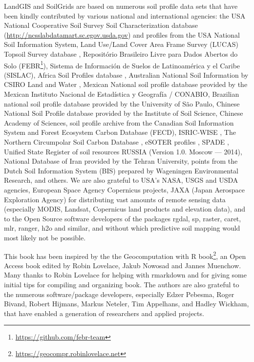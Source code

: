 \documentclass[graybox,natbib,nospthms,UStrade]{svmono}
\renewcommand{\href}[2]{#2 (\url{#1})}
\renewcommand{\href}[2]{#2\footnote{\url{#1}}}
\begin{document}
LandGIS and SoilGrids are based on numerous soil profile data sets that have been
kindly contributed by various national and international agencies: the
USA National Cooperative Soil Survey Soil Characterization database
(\url{http://ncsslabdatamart.sc.egov.usda.gov}) and profiles from the USA
National Soil Information System, Land Use/Land Cover Area
Frame Survey (LUCAS) Topsoil Survey database \citep{Toth2013LUCAS},
Repositório Brasileiro Livre para Dados Abertos do Solo (\href{https://github.com/febr-team}{FEBR}),
Sistema de Información de Suelos de Latinoamérica y el Caribe (SISLAC),
Africa Soil Profiles database \citep{Leenaars2012}, Australian National Soil
Information by CSIRO Land and Water \citep{Karssies2011CSIRO, searle2014australian},
Mexican National soil profile database \citep{INEGI2000} provided by
the Mexican Instituto Nacional de Estadística y Geografía / CONABIO,
Brazilian national soil profile database \citep{cooper2005national}
provided by the University of São Paulo, Chinese
National Soil Profile database \citep{shangguan2013china} provided by the
Institute of Soil Science, Chinese Academy of Sciences, soil profile
archive from the Canadian Soil Information System \citep{macdonald1992cansis}
and Forest Ecosystem Carbon Database (FECD), ISRIC-WISE \citep{Batjes2009SUM},
The Northern Circumpolar Soil Carbon Database \citep{essd-5-3-2013}, eSOTER
profiles \citep{VanEngelen2012}, SPADE \citep{hollis2006spade}, Unified State Register
of soil resources RUSSIA (Version 1.0. Moscow --- 2014), National Database
of Iran provided by the Tehran University, points from the Dutch Soil
Information System (BIS) prepared by Wageningen Environmental Research,
and others. We are also grateful to USA's NASA, USGS and USDA agencies,
European Space Agency Copernicus projects, JAXA (Japan Aerospace Exploration Agency)
for distributing vast amounts of remote sensing data (especially MODIS, Landsat, Copernicus
land products and elevation data), and to the Open Source software developers
of the packages rgdal, sp, raster, caret, mlr, ranger, h2o and similar,
and without which predictive soil mapping would most likely not be possible.

This book has been inspired by the \href{https://geocompr.robinlovelace.net}{the Geocomputation with R book}, an Open Access book edited by Robin Lovelace, Jakub Nowosad and Jannes Muenchow. Many thanks to Robin Lovelace for helping with rmarkdown and for giving some initial tips for compiling and organizing book. The authors are also grateful to the numerous software/package developers, especially Edzer Pebesma, Roger Bivand, Robert Hijmans, Markus Neteler, Tim Appelhans, and Hadley Wickham, that have enabled a generation of researchers and applied projects.
\end{document}
